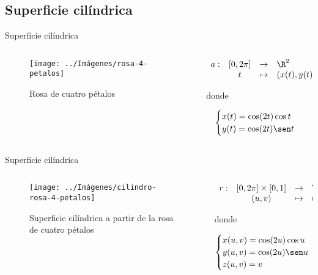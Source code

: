 \documentclass[10pt]{beamer}
\begin{document}
	\subsection{Superficie cilíndrica}
	
	\begin{frame}{Superficie cilíndrica}
		
		\begin{columns}[t] %
			\begin{column}{.60\textwidth}
				\begin{figure}
					\centering
					\texttt{[image: ../Imágenes/rosa-4-petalos]}
					\caption{Rosa de cuatro pétalos}
					\label{fig:rosa-4-petalos}
				\end{figure}
			\end{column}%
			\hfill%
			\begin{column}{.40\textwidth}
				$$\begin{array}{rcll}
					a : & [0, 2\pi] & \to & \R^2\\
						& t & \mapsto & (x(t), y(t))
				\end{array}$$
				
			donde 
			
			$$ \begin{cases}
			x(t) = \cos(2t)\cos t \\
			y(t) = \cos(2t) \sen t
			\end{cases} $$
			\end{column}%
		\end{columns}
	
	\end{frame}
	
	\begin{frame}{Superficie cilíndrica}
		
		\begin{columns}[t] %
			\begin{column}{.50\textwidth}
				\begin{figure}
					\centering
					\texttt{[image: ../Imágenes/cilindro-rosa-4-petalos]}
					\caption{Superficie cilíndrica a partir de la rosa de cuatro pétalos}
					\label{fig:cilindro-rosa-4-petalos}
				\end{figure}
			\end{column}%
			\hfill%
			\begin{column}{.50\textwidth}
				$$\begin{array}{rcll}
				r : & [0, 2\pi] \times [0,1] & \to & \R^3\\
				& (u,v) & \mapsto & (x,y,z)
				\end{array}$$
				
				donde 
				
				$$ \begin{cases}
				x(u,v) = \cos(2u)\cos u \\
				y(u,v) = \cos(2u) \sen u \\
				z(u,v) = v
				\end{cases} $$
			\end{column}%
		\end{columns}
		
	\end{frame}
	
\end{document}
